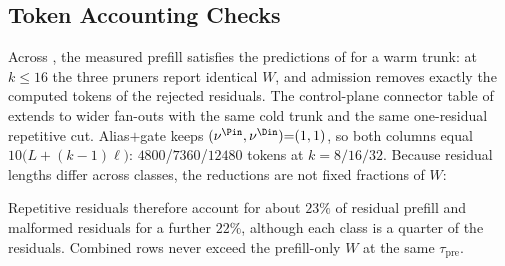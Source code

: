 \subsection{Token Accounting Checks}
\label{sec:ablate-idents}

Across , the measured prefill satisfies the predictions of  for a warm trunk:
at $k\le16$ the three pruners report identical $W$, and admission removes exactly the computed tokens of the rejected residuals.
The control-plane connector table of  extends to wider fan-outs with the same cold trunk and the same one-residual repetitive cut.
Alias$+$gate keeps $(\nu^{\Pin},\nu^{\Din}){=}(1,1)$, so both columns equal $10\bigl(L+(k{-}1)\ell\bigr)$: $4800$/$7360$/$12480$ tokens at $k{=}8/16/32$.
Because residual lengths differ across classes, the reductions are not fixed fractions of $W$:
\begin{center}
\end{center}
Repetitive residuals therefore account for about $23\%$ of residual prefill and malformed residuals for a further $22\%$, although each class is a quarter of the residuals.
Combined rows never exceed the prefill-only $W$ at the same $\tau_{\mathrm{pre}}$.
